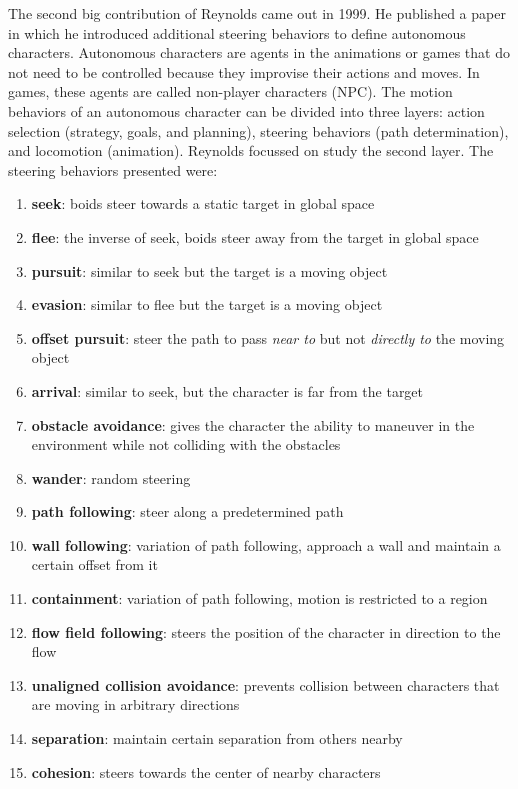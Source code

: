 The second big contribution of Reynolds came out in 1999. He published a paper in which he introduced additional steering behaviors to define autonomous characters\cite{craigSteeringBehaviors}. Autonomous characters are agents in the animations or games that do not need to be controlled because they improvise their actions and moves. In games, these agents are called non-player characters (NPC). The motion behaviors of an autonomous character can be divided into three layers: action selection (strategy, goals, and planning), steering behaviors (path determination), and locomotion (animation). Reynolds focussed on study the second layer. The steering behaviors presented were:
\begin{enumerate}
\item \textbf{seek}: boids steer towards a static target in global space
\item \textbf{flee}: the inverse of seek, boids steer away from the target in global space
\item \textbf{pursuit}: similar to seek but the target is a moving object
\item \textbf{evasion}: similar to flee but the target is a moving object
\item \textbf{offset pursuit}: steer the path to pass \textit{near to} but not \textit{directly to} the moving object
\item \textbf{arrival}: similar to seek, but the character is far from the target
\item \textbf{obstacle avoidance}: gives the character the ability to maneuver in the environment while not colliding with the obstacles 
\item \textbf{wander}: random steering
\item \textbf{path following}: steer along a predetermined path
\item \textbf{wall following}: variation of path following, approach a wall and maintain a certain offset from it
\item \textbf{containment}: variation of path following, motion is restricted to a region
\item \textbf{flow field following}: steers the position of the character in direction to the flow
\item \textbf{unaligned collision avoidance}: prevents collision between characters that are moving in arbitrary directions
\item \textbf{separation}: maintain certain separation from others nearby
\item \textbf{cohesion}: steers towards the center of nearby characters

\end{enumerate}
